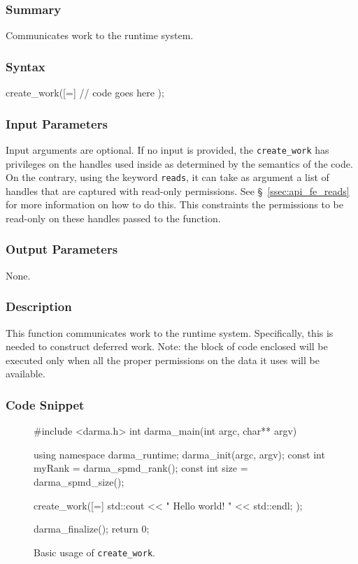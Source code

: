 \hspace{0.1cm} %
\begin{subs}
\vspace{-1.2cm}

\subsubsection{Summary} 
Communicates work to the runtime system.

\subsubsection{Syntax} 
\begin{CppCode}
create_work([=]
{ 
	// code goes here
});
\end{CppCode}

\subsubsection{Input Parameters} 
Input arguments are optional. If no input is provided, the 
\texttt{create\_work} has privileges on the handles used inside 
as determined by the semantics of the code. 
On the contrary, using the keyword \texttt{reads}, it can take as 
argument a list of handles that are captured with read-only permissions. 
See \S~\ref{ssec:api_fe_reads} for more information on how to do this. 
This constraints the permissions to be read-only 
on these handles passed to the function.


\subsubsection{Output Parameters} 
None.

\subsubsection{Description} 
This function communicates work to the runtime system. 
Specifically, this is needed to construct deferred work. 
Note: the block of code enclosed will be executed only when all the 
proper permissions on the data it uses will be available.


\subsubsection{Code Snippet} 
\begin{figure}[!h]
\begin{CppCodeNumb}
#include <darma.h>
int darma_main(int argc, char** argv)
{
  using namespace darma_runtime;
  darma_init(argc, argv);
  const int myRank = darma_spmd_rank();
  const int size = darma_spmd_size();

  create_work([=]
  {
  	std::cout << " Hello world! " << std::endl;
  });

  darma_finalize();
  return 0;
}
\end{CppCodeNumb}
\label{fig:fe_api_cw}
\caption{Basic usage of \texttt{create\_work}.}
\end{figure}

\end{subs}
